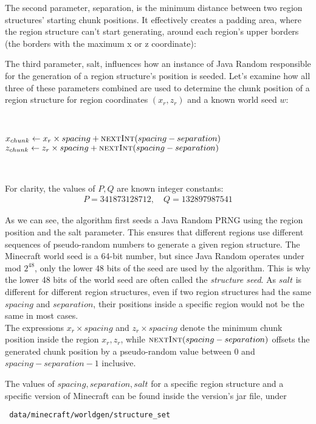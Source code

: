 \documentclass{article}
\begin{document}
The second parameter, separation, is the minimum distance between two region structures' starting chunk positions. It effectively creates a padding area, where the region structure can't start generating, around each region's upper borders (the borders with the maximum x or z coordinate):

The third parameter, salt, influences how an instance of Java Random responsible for the generation of a region structure's position is seeded. 
Let's examine how all three of these parameters combined are used to determine the chunk position of a region structure for region coordinates $(x_r, z_r)$ and a known world seed $w$:

\
\begin{algorithmic}
\State {}
\State $x_{chunk} \gets x_r \times spacing + \Call{nextInt}{spacing - separation}$
\State $z_{chunk} \gets z_r \times spacing + \Call{nextInt}{spacing - separation}$
\end{algorithmic}
\ \

\noindent For clarity, the values of $P, Q$ are known integer constants:
\begin{align*}
    P = 341873128712, \quad Q = 132897987541
\end{align*}

As we can see, the algorithm first seeds a Java Random PRNG using the region position and the salt parameter. This ensures that different regions use different sequences of pseudo-random numbers to generate a given region structure. The Minecraft world seed is a 64-bit number, but since Java Random operates under mod $2^{48}$, only the lower 48 bits of the seed are used by the algorithm. This is why the lower 48 bits of the world seed are often called the \emph{structure seed}. As $salt$ is different for different region structures, even if two region structures had the same $spacing$ and $separation$, their positions inside a specific region would not be the same in most cases. \\
The expressions $x_r \times spacing$ and $z_r \times spacing$ denote the minimum chunk position inside the region $x_r, z_r$, while $\Call{nextInt}{spacing - separation}$ offsets the generated chunk position by a pseudo-random value between 0 and $spacing - separation - 1$ inclusive.

The values of $spacing, separation, salt$ for a specific region structure and a specific version of Minecraft can be found inside the version's jar file, under 
\begin{verbatim} data/minecraft/worldgen/structure_set \end{verbatim}
\end{document}
